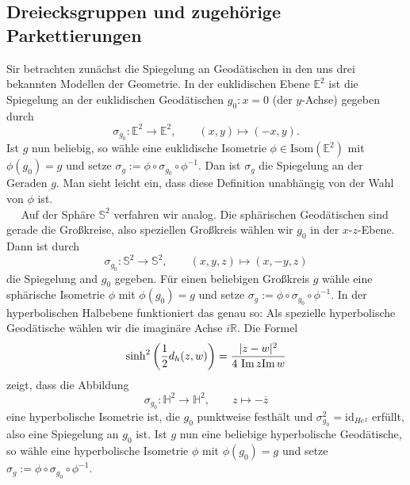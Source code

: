 \documentclass[11pt]{book}
\numberwithin{dummy}{section}
\theoremstyle{nonumberbreak}
\newcommand{\E}{\mathbb{E}}
\newcommand{\R}{\mathbb{R}}
\newcommand{\Sph}{\mathbb{S}}
\newcommand{\He}{\mathbb{H}}
\newcommand{\la}{\longrightarrow}
\newcommand{\Img}{\mathrm{Im} \hspace{1.5pt}}
\newcommand{\id}{\mathrm{id}}
\begin{document}
\begin{spacing}{1.4}
 



\section{Dreiecksgruppen und zugehörige Parkettierungen} %



Sir betrachten zunächst die Spiegelung an Geodätischen in den uns drei bekannten Modellen der Geometrie. In der euklidischen Ebene $\E^2$ ist die Spiegelung an der euklidischen Geodätischen $g_0: x=0$ (der $y$-Achse) gegeben durch 
$$\sigma_{g_0}: \E^2 \la \E^2, \qquad (x,y) \mapsto (-x,y).$$
Ist $g$ nun beliebig, so wähle eine euklidische Isometrie $\phi \in \mathrm{Isom}(\E^2)$ mit $\phi(g_0) = g$ und setze $\sigma_g := \phi \circ \sigma_{g_0} \circ \phi^{-1}$. Dan ist $\sigma_g$ die Spiegelung an der Geraden $g$. Man sieht leicht ein, dass diese Definition unabhängig von der Wahl von $\phi$ ist.\\
$\quad$ Auf der Sphäre $\Sph^2$ verfahren wir analog. Die sphärischen Geodätischen sind gerade die Großkreise, also speziellen Großkreis wählen wir $g_0$ in der $x$-$z$-Ebene. Dann ist durch 
$$\sigma_{g_0}: \Sph^2 \la \Sph^2, \qquad (x,y,z) \mapsto (x,-y,z)$$
die Spiegelung and $g_0$ gegeben. Für einen beliebigen Großkreis $g$ wähle eine sphärische Isometrie $\phi$ mit $\phi(g_0) = g$ und setze $\sigma_g := \phi \circ \sigma_{g_0} \circ \phi^{-1}$.
In der hyperbolischen Halbebene funktioniert das genau so: Als spezielle hyperbolische Geodätische wählen wir die imaginäre Achse $i\R$. Die Formel 
$$\sinh^2 \left( \frac{1}{2} d_h(z,w)\right) = \frac{\vert z-w \vert^2}{4\  \Img z \Img w}$$
zeigt, dass die Abbildung
$$\sigma_{g_0}: \He^2 \la \He^2, \qquad z \mapsto - \overline{z}$$
eine hyperbolische Isometrie ist, die $g_0$ punktweise festhält und $\sigma_{g_0}^2= \id_{He^2}$ erfüllt, also eine Spiegelung an $g_0$ ist. Ist $g$ nun eine beliebige hyperbolische Geodätische, so wähle eine hyperbolische Isometrie $\phi$ mit $\phi(g_0) = g$ und setze $\sigma_g := \phi \circ \sigma_{g_0} \circ \phi^{-1}$.


\end{spacing}
\end{document}
